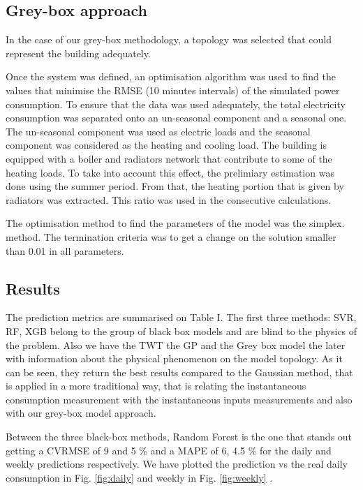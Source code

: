 \documentclass[10pt, conference, compsocconf]{IEEEtran}
\begin{document}
\subsection{Grey-box approach}

In the case of our grey-box methodology, a topology was selected that could represent the building adequately.


Once the system was defined, an optimisation algorithm was used to find the values that minimise the RMSE (10 minutes intervals) of the simulated power consumption. To ensure that the data was used adequately, the total electricity consumption was separated onto an un-seasonal component and a seasonal one. The un-seasonal component was used as electric loads and the seasonal component was considered as the heating and cooling load. The building is equipped with a boiler and radiators network that contribute to some of the heating loads. To take into account this effect, the prelimiary estimation was done using the summer period. From that, the heating portion that is given by radiators was extracted. This ratio was used in the consecutive calculations.

The optimisation method to find the parameters of the model was the simplex. method. The termination criteria was to get a change on the solution smaller than 0.01 in all parameters. %


\subsection{Results}

The prediction metrics are summarised on Table I. The first three methods: SVR, RF, XGB  belong to the group of black box models and are blind to the physics of the problem. Also we have the TWT the GP and the Grey box model the later with information about the physical phenomenon on the model topology. As it can be seen, they return the best results compared to the Gaussian method, that is applied in a more traditional way, that is relating the instantaneous consumption measurement with the instantaneous inputs measurements and also with our grey-box model approach. 

Between the three black-box methods, Random Forest is the one that stands out getting a CVRMSE of 9 and 5 \%  and a MAPE of 6, 4.5 \% for the daily and weekly predictions respectively. We have plotted the prediction vs the real daily consumption in Fig. \ref{fig:daily} and weekly in Fig. \ref{fig:weekly} .
\end{document}
